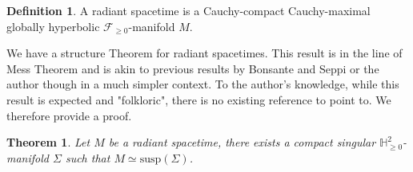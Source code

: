 \documentclass[a4paper,12pt]{article}
\def\H{\mathbb{H}}
\def\susp{\mathrm{susp}}
\def\Future{\mathcal F}
\def\susp{\mathrm{susp}}
\newtheorem{theo}{Theorem}	%
\theoremstyle{definition}
\newtheorem{defi}[lem]{Definition}	%
\begin{document}
		\begin{defi} A radiant spacetime is a Cauchy-compact Cauchy-maximal globally hyperbolic $\Future_{\geq0}$-manifold $M$.
		\end{defi}
			We have a structure Theorem for radiant spacetimes. This result is in the line of Mess Theorem \cite{mess} and is akin to previous results by Bonsante and Seppi \cite{seppiH2} or the author \cite{brunswic2021Cauchy} though in a much simpler context. To the author's knowledge, while this result is expected and "folkloric", there is no existing reference to point to. We therefore provide a proof.

				\begin{theo}\label{theo:radiant_struc} Let $M$ be a radiant spacetime, there exists a compact singular $\H^2_{\geq0}$-manifold $\Sigma$ such that $M \simeq \susp(\Sigma)$.
		\end{theo}
\end{document}
